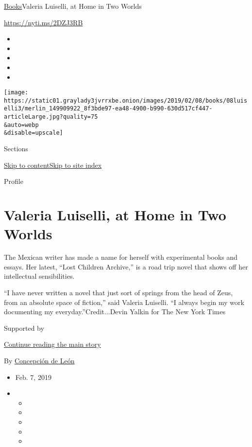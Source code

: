 \href{/section/books}{Books}\textbar{}Valeria Luiselli, at Home in Two
Worlds

\url{https://nyti.ms/2DZJ3RB}

\begin{itemize}
\item
\item
\item
\item
\item
\end{itemize}

\texttt{[image: https://static01.graylady3jvrrxbe.onion/images/2019/02/08/books/08luiselli3/merlin\_149909922\_8f3bde97-ea48-4900-b990-630d517cf447-articleLarge.jpg?quality=75\\\&auto=webp\\\&disable=upscale]}

Sections

\protect\hyperlink{site-content}{Skip to
content}\protect\hyperlink{site-index}{Skip to site index}

Profile

\hypertarget{valeria-luiselli-at-home-in-two-worlds}{%
\section{Valeria Luiselli, at Home in Two
Worlds}\label{valeria-luiselli-at-home-in-two-worlds}}

The Mexican writer has made a name for herself with experimental books
and essays. Her latest, ``Lost Children Archive,'' is a road trip novel
that shows off her intellectual sensibilities.

``I have never written a novel that just sort of springs from the head
of Zeus, from an absolute space of fiction,'' said Valeria Luiselli. ``I
always begin my work documenting my everyday.''Credit...Devin Yalkin for
The New York Times

Supported by

\protect\hyperlink{after-sponsor}{Continue reading the main story}

By
\href{https://www.nytimes3xbfgragh.onion/by/concepcion-de-leon}{Concepción
de León}

\begin{itemize}
\item
  Feb. 7, 2019
\item
  \begin{itemize}
  \item
  \item
  \item
  \item
  \item
  \end{itemize}
\end{itemize}

